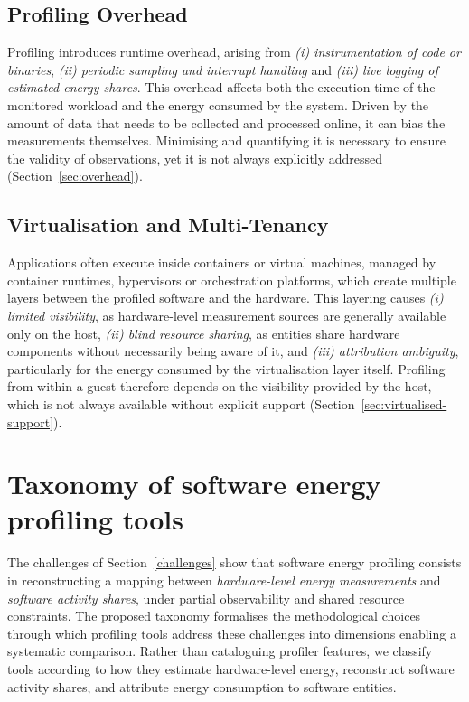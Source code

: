 \documentclass[
  acmsmall,
  screen,
  review,
  xcolor={dvipsnames,usenames}
]{acmart}
\begin{document}
\subsection{Profiling Overhead}

Profiling introduces runtime overhead, arising from \emph{(i) instrumentation of code or binaries}, \emph{(ii) periodic sampling and interrupt handling} and \emph{(iii) live logging of estimated energy shares}.  This overhead affects both the execution time of the monitored workload and the energy consumed by the system. Driven by the amount of data that needs to be collected and processed online, it can bias the measurements themselves. Minimising and quantifying it is necessary to ensure the validity of observations, yet it is not always explicitly addressed (Section~\ref{sec:overhead}).

\subsection{Virtualisation and Multi-Tenancy}

Applications often execute inside containers or virtual machines, managed by container runtimes, hypervisors or orchestration platforms, which create multiple layers between the profiled software and the hardware. This layering causes \emph{(i) limited visibility}, as hardware-level measurement sources are generally available only on the host, \emph{(ii) blind resource sharing}, as entities share hardware components without necessarily being aware of it, and \emph{(iii) attribution ambiguity}, particularly for the energy consumed by the virtualisation layer itself. Profiling from within a guest therefore depends on the visibility provided by the host, which is not always available without explicit support (Section~\ref{sec:virtualised-support}).


\section{Taxonomy of software energy profiling tools} \label{taxonomy}

The challenges of Section~\ref{challenges} show that software energy profiling consists in reconstructing a mapping between \emph{hardware-level energy measurements} and \emph{software activity shares}, under partial observability and shared resource constraints. The proposed taxonomy formalises the methodological choices through which profiling tools address these challenges into dimensions enabling a systematic comparison. Rather than cataloguing profiler features, we classify tools according to how they estimate hardware-level energy, reconstruct software activity shares, and attribute energy consumption to software entities.
\end{document}
